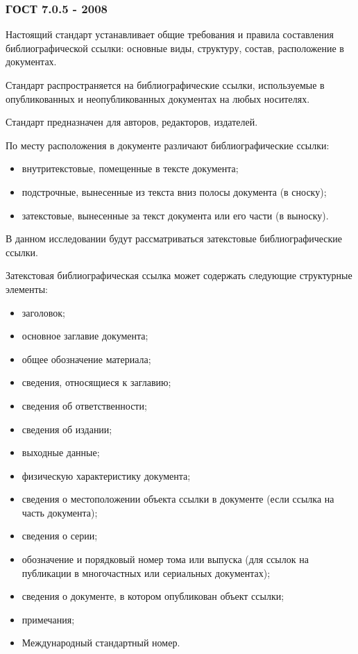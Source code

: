 \subsubsection{ГОСТ 7.0.5 - 2008}

Настоящий стандарт устанавливает общие требования и правила составления библиографической ссылки: основные виды, структуру, состав, расположение в документах.

Стандарт распространяется на библиографические ссылки, используемые в опубликованных и неопубликованных документах на любых носителях.

Стандарт предназначен для авторов, редакторов, издателей.

По месту расположения в документе различают библиографические ссылки:
\begin{itemize}
	\item внутритекстовые, помещенные в тексте документа;
	\item подстрочные, вынесенные из текста вниз полосы документа (в сноску);
	\item затекстовые, вынесенные за текст документа или его части (в выноску).
\end{itemize}

В данном исследовании будут рассматриваться затекстовые библиографические ссылки.

Затекстовая библиографическая ссылка может содержать следующие структурные элементы:
\begin{itemize}
	\item заголовок;
	\item основное заглавие документа;
	\item общее обозначение материала;
	\item сведения, относящиеся к заглавию;
	\item сведения об ответственности;
	\item сведения об издании;
	\item выходные данные;
	\item физическую характеристику документа;
	\item сведения о местоположении объекта ссылки в документе (если ссылка на часть документа);
	\item сведения о серии;
	\item обозначение и порядковый номер тома или выпуска (для ссылок на публикации в многочастных или сериальных документах);
	\item сведения о документе, в котором опубликован объект ссылки;
	\item примечания;
	\item Международный стандартный номер.
\end{itemize}

